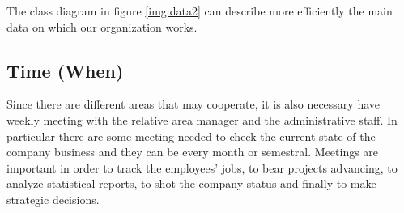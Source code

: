The class diagram in figure \ref{img:data2} can describe more efficiently  
the main data on which our organization works.





\subsection{Time (When)}
\label{subsec:enterprise[Time]}
Since there are different areas that may cooperate, it is also necessary have weekly meeting with the relative area manager and the administrative staff. In particular there are some meeting needed to check the current state of the company business and they can be every month or semestral. Meetings are important in order to track the employees' jobs, to bear projects advancing, to analyze statistical reports, to shot the company status and finally to make strategic decisions.


